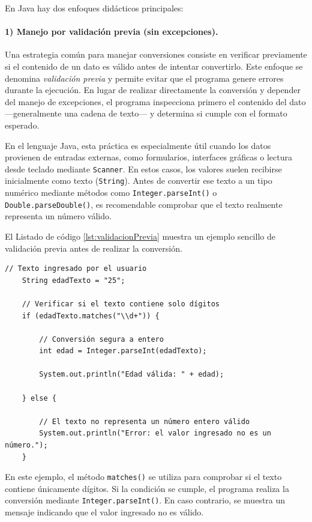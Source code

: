 \documentclass[12pt,twoside]{book}
\begin{document}
						En Java hay dos enfoques didácticos principales:
						
						\paragraph{1) Manejo por validación previa (sin excepciones).}
						Una estrategia común para manejar conversiones consiste en verificar previamente si el contenido de un dato es válido antes de intentar convertirlo. Este enfoque se denomina \textit{validación previa} y permite evitar que el programa genere errores durante la ejecución. En lugar de realizar directamente la conversión y depender del manejo de excepciones, el programa inspecciona primero el contenido del dato —generalmente una cadena de texto— y determina si cumple con el formato esperado.
						
						En el lenguaje Java, esta práctica es especialmente útil cuando los datos provienen de entradas externas, como formularios, interfaces gráficas o lectura desde teclado mediante \texttt{Scanner}. En estos casos, los valores suelen recibirse inicialmente como texto (\texttt{String}). Antes de convertir ese texto a un tipo numérico mediante métodos como \texttt{Integer.parseInt()} o \texttt{Double.parseDouble()}, es recomendable comprobar que el texto realmente representa un número válido.
						
						El Listado de código \ref{lst:validacionPrevia} muestra un ejemplo sencillo de validación previa antes de realizar la conversión.
						
						\begin{lstlisting}[style=Java,caption={Validación previa antes de convertir texto a entero.}, label={lst:validacionPrevia}]
	// Texto ingresado por el usuario
	String edadTexto = "25";
	
	// Verificar si el texto contiene solo dígitos
	if (edadTexto.matches("\\d+")) {
		
		// Conversión segura a entero
		int edad = Integer.parseInt(edadTexto);
		
		System.out.println("Edad válida: " + edad);
		
	} else {
		
		// El texto no representa un número entero válido
		System.out.println("Error: el valor ingresado no es un número.");
	} \end{lstlisting}
						
						\noindent
						En este ejemplo, el método \texttt{matches()} se utiliza para comprobar si el texto contiene únicamente dígitos. Si la condición se cumple, el programa realiza la conversión mediante \texttt{Integer.parseInt()}. En caso contrario, se muestra un mensaje indicando que el valor ingresado no es válido.
						
\end{document}
